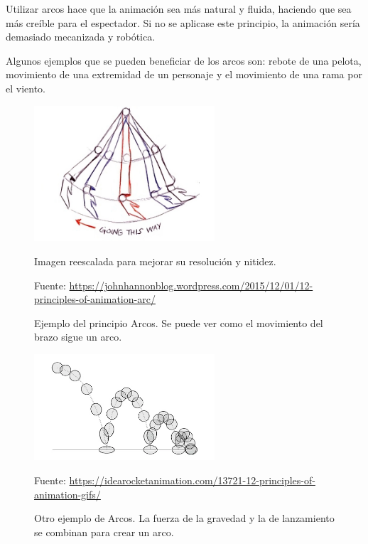 \documentclass{article}
\begin{document}
\bigskip

Utilizar arcos hace que la animación sea más natural y fluida, haciendo que sea más creíble para el espectador. Si no se aplicase este principio, la animación sería demasiado mecanizada y robótica.

\bigskip

Algunos ejemplos que se pueden beneficiar de los arcos son: rebote de una pelota, movimiento de una extremidad de un personaje y el movimiento de una rama por el viento.

\begin{figure}[H]
    \centering
    \includegraphics[width=0.6\textwidth]{imagenes/arm-arc.jpg}
    \caption{Ejemplo del principio Arcos. Se puede ver como el movimiento del brazo sigue un arco.}
    \vspace{5pt}
    \footnotesize{Imagen reescalada para mejorar su resolución y nitidez.}

    \vspace{10pt}
    \footnotesize{Fuente: \url{https://johnhannonblog.wordpress.com/2015/12/01/12-principles-of-animation-arc/}}
\end{figure}

\begin{figure}[H]
    \centering
    \includegraphics[width=0.6\textwidth]{imagenes/bouncing-ball.png}
    \caption{Otro ejemplo de Arcos. La fuerza de la gravedad y la de lanzamiento se combinan para crear un arco.}
    \vspace{10pt}
    \footnotesize{Fuente: \url{https://idearocketanimation.com/13721-12-principles-of-animation-gifs/}}
\end{figure}
\end{document}
